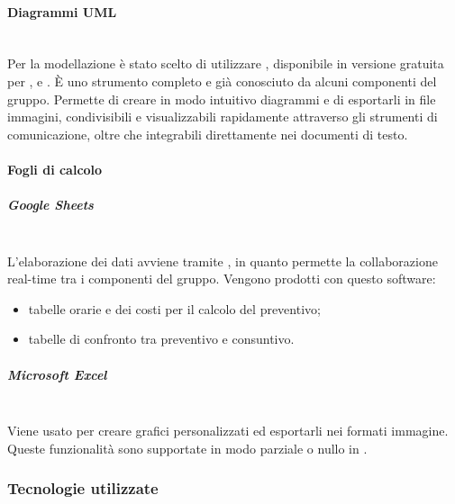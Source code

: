 \paragraph{Diagrammi UML}\mbox{}\\
Per la modellazione  è stato scelto di utilizzare \textbf{}, disponibile in versione gratuita per ,  e . \`{E} uno strumento completo e già conosciuto da alcuni componenti del gruppo. Permette di creare in modo intuitivo diagrammi  e di esportarli in file immagini, condivisibili e visualizzabili rapidamente attraverso gli strumenti di comunicazione, oltre che integrabili direttamente nei documenti di testo.

\paragraph{Fogli di calcolo} \label{sec:fogli_di_calcolo}\mbox{}
\subparagraph{Google Sheets}\mbox{}\\
L'elaborazione dei dati avviene tramite , in quanto permette la collaborazione real-time tra i componenti del gruppo. Vengono prodotti con questo software:
	\begin{itemize}
	\item tabelle orarie e dei costi per il calcolo del preventivo;
	\item tabelle di confronto tra preventivo e consuntivo.
	\end{itemize}

\subparagraph{Microsoft Excel} \mbox{}\\
Viene usato per creare grafici personalizzati ed esportarli nei formati immagine. Queste funzionalità sono supportate in modo parziale o nullo in .

\subsubsection{Tecnologie utilizzate}
